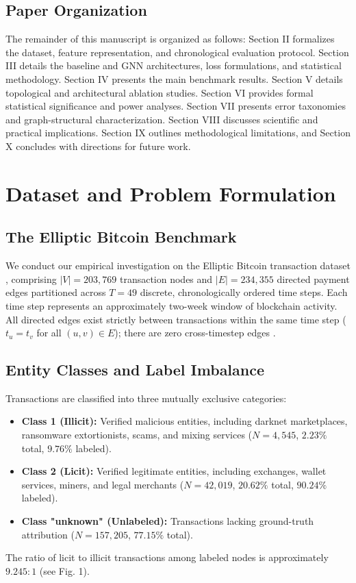 \documentclass[conference]{IEEEtran}
\begin{document}
\subsection{Paper Organization}
The remainder of this manuscript is organized as follows: Section II formalizes the dataset, feature representation, and chronological evaluation protocol. Section III details the baseline and GNN architectures, loss formulations, and statistical methodology. Section IV presents the main benchmark results. Section V details topological and architectural ablation studies. Section VI provides formal statistical significance and power analyses. Section VII presents error taxonomies and graph-structural characterization. Section VIII discusses scientific and practical implications. Section IX outlines methodological limitations, and Section X concludes with directions for future work.

\section{Dataset and Problem Formulation}

\subsection{The Elliptic Bitcoin Benchmark}
We conduct our empirical investigation on the Elliptic Bitcoin transaction dataset \cite{weber2019elliptic}, comprising $|V| = 203,769$ transaction nodes and $|E| = 234,355$ directed payment edges partitioned across $T = 49$ discrete, chronologically ordered time steps. Each time step represents an approximately two-week window of blockchain activity. All directed edges exist strictly between transactions within the same time step ($t_u = t_v$ for all $(u, v) \in E$); there are zero cross-timestep edges \cite{weber2019elliptic}.

\subsection{Entity Classes and Label Imbalance}
Transactions are classified into three mutually exclusive categories:
\begin{itemize}
    \item \textbf{Class 1 (Illicit):} Verified malicious entities, including darknet marketplaces, ransomware extortionists, scams, and mixing services ($N = 4,545$, $2.23\%$ total, $9.76\%$ labeled).
    \item \textbf{Class 2 (Licit):} Verified legitimate entities, including exchanges, wallet services, miners, and legal merchants ($N = 42,019$, $20.62\%$ total, $90.24\%$ labeled).
    \item \textbf{Class "unknown" (Unlabeled):} Transactions lacking ground-truth attribution ($N = 157,205$, $77.15\%$ total).
\end{itemize}
The ratio of licit to illicit transactions among labeled nodes is approximately $9.245:1$ (see Fig. 1).
\end{document}
